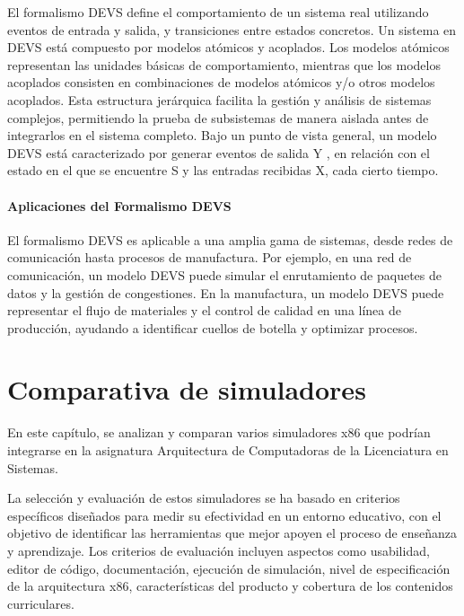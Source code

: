\documentclass[12pt,twoside]{templates/unerthesis}
\begin{document}
El formalismo DEVS define el comportamiento de un sistema real utilizando eventos de entrada y salida, y transiciones entre estados concretos. Un sistema en DEVS está compuesto por modelos atómicos y acoplados. Los modelos atómicos representan las unidades básicas de comportamiento, mientras que los modelos acoplados consisten en combinaciones de modelos atómicos y/o otros modelos acoplados. Esta estructura jerárquica facilita la gestión y análisis de sistemas complejos, permitiendo la prueba de subsistemas de manera aislada antes de integrarlos en el sistema completo.
Bajo un punto de vista general, un modelo DEVS está caracterizado por generar eventos de salida Y , en relación con el estado en el que se encuentre S y las entradas recibidas X, cada cierto tiempo.

\hypertarget{aplicaciones-del-formalismo-devs}{%
\subsubsection{Aplicaciones del Formalismo DEVS}\label{aplicaciones-del-formalismo-devs}}

El formalismo DEVS es aplicable a una amplia gama de sistemas, desde redes de comunicación hasta procesos de manufactura. Por ejemplo, en una red de comunicación, un modelo DEVS puede simular el enrutamiento de paquetes de datos y la gestión de congestiones. En la manufactura, un modelo DEVS puede representar el flujo de materiales y el control de calidad en una línea de producción, ayudando a identificar cuellos de botella y optimizar procesos.

\hypertarget{comparativa-de-simuladores}{%
\chapter{Comparativa de simuladores}\label{comparativa-de-simuladores}}

En este capítulo, se analizan y comparan varios simuladores x86 que podrían integrarse en la asignatura Arquitectura de Computadoras de la Licenciatura en Sistemas.

La selección y evaluación de estos simuladores se ha basado en criterios específicos diseñados para medir su efectividad en un entorno educativo, con el objetivo de identificar las herramientas que mejor apoyen el proceso de enseñanza y aprendizaje. Los criterios de evaluación incluyen aspectos como usabilidad, editor de código, documentación, ejecución de simulación, nivel de especificación de la arquitectura x86, características del producto y cobertura de los contenidos curriculares.
\end{document}

